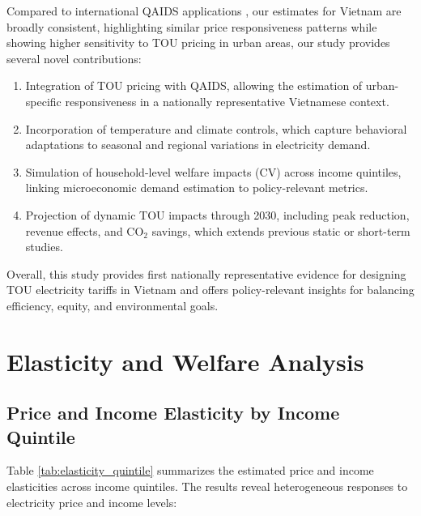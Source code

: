 \documentclass[12pt,a4paper]{article}
\begin{document}
	Compared to international QAIDS applications \citep{krishnamurthy2015, wang2017}, 
	our estimates for Vietnam are broadly consistent, highlighting similar price responsiveness patterns while showing higher sensitivity to TOU pricing in urban areas, our study provides several novel contributions:
	
	\begin{enumerate}
		\item Integration of TOU pricing with QAIDS, allowing the estimation of urban-specific responsiveness in a nationally representative Vietnamese context.
		\item Incorporation of temperature and climate controls, which capture behavioral adaptations to seasonal and regional variations in electricity demand.
		\item Simulation of household-level welfare impacts (CV) across income quintiles, linking microeconomic demand estimation to policy-relevant metrics.
		\item Projection of dynamic TOU impacts through 2030, including peak reduction, revenue effects, and CO$_2$ savings, which extends previous static or short-term studies.
	\end{enumerate}
	
	Overall, this study provides first nationally representative evidence for designing TOU electricity tariffs in Vietnam and offers policy-relevant insights for balancing efficiency, equity, and environmental goals.
		
	\section{Elasticity and Welfare Analysis}
	
	\subsection{Price and Income Elasticity by Income Quintile}
	
	Table \ref{tab:elasticity_quintile} summarizes the estimated price and income elasticities across income quintiles. The results reveal heterogeneous responses to electricity price and income levels:
	
\end{document}

